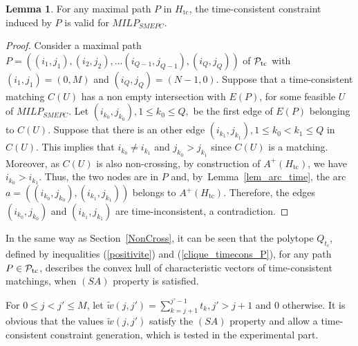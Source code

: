\documentclass[11pt]{article}
\theoremstyle{plain}%
\theoremstyle{definition} \newtheorem{lem}{Lemma}[section]
\theoremstyle{definition} \newtheorem{claim}{Claim}[lem]
\theoremstyle{definition} \newtheorem{theorem}{Theorem}[section]
\theoremstyle{definition} \newtheorem{exo}{Exercice n$^\circ$}
\theoremstyle{definition} \newtheorem{quest}{}[exo]
\theoremstyle{definition} \newtheorem{sousquest}{}[quest]
\theoremstyle{remark}
\theoremstyle{definition}
\begin{document}
\begin{lem}\label{lem_timecons}
For any maximal path $P$ in $H_\textrm{tc}$, the time-consistent constraint induced by $P$ is valid for $MILP_{SMEPC}$.
\end{lem}
\begin{proof}
Consider a maximal path $P =( (i_1, j_1), (i_2, j_2), \dots (i_{Q-1}, j_{Q-1}), (i_{Q}, j_{Q}))$
 of ${\cal P}_\textrm{tc}$
with $(i_1, j_1)=(0,M)$ and $(i_{Q}, j_{Q})=(N-1, 0)$. 
Suppose that a time-consistent matching $C(U)$ has a non empty
intersection with $E(P)$, for some feasible $U$ of $MILP_{SMEPC}$. 
Let $(i_{k_0},j_{k_0}), 1 \le k_0 \le Q,$ be the first edge of $E(P)$ belonging to $C(U)$.
Suppose that there is an other edge   $(i_{k_1},j_{k_1}), 1 \le k_0 < k_1 \le Q$ in $C(U)$. This implies that $ i_{k_0} \neq i_{k_1}$ and
$ j_{k_0} > j_{k_1}$ since $C(U)$ is a matching. Moreover, as $C(U)$ is also non-crossing,
by construction of $A^+(H_\textrm{tc})$, 
we have $ i_{k_0} > i_{k_1}$. 
Thus, the two nodes are in $P$ and, by~Lemma~\ref{lem_arc_time}, the
arc $a=((i_{k_0},j_{k_0}), (i_{k_1},j_{k_1})) $ belongs to  $A^+(H_\textrm{tc})$. 
Therefore, the edges $(i_{k_0},j_{k_0})$ and $(i_{k_1},j_{k_1})$
are time-inconsistent, a contradiction.
\end{proof}

In the same way as Section~\ref{NonCross}, it can be seen that the polytope $Q_{t_c}$, defined by inequalities (\ref{positivite}) and (\ref{clique_timecons_P}), for any path $P \in {\cal P}_\textrm{tc}$, describes the convex hull of characteristic vectors of time-consistent matchings, when $(SA)$ property is satisfied.

For $0\le j<j'\le M$, let $\tilde{w}(j, j')=\sum_{k=j+1}^{j'-1} t_k, j'>j+1$ and $0$ otherwise. It is
obvious  that the values $\tilde{w}(j,j')$ satisfy the $(SA)$ property and allow a time-consistent constraint generation, which is tested in the experimental part.

\end{document}
